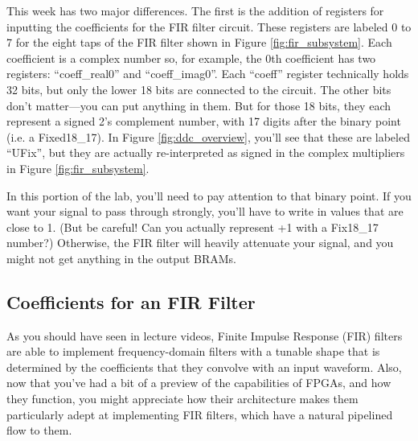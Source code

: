 \documentclass[11pt]{article}
\begin{document}
This week has two major differences.  The first is the addition of registers for inputting the
coefficients for the FIR filter circuit.  These registers are labeled 0 to 7 for the eight
taps of the FIR filter shown in Figure \ref{fig:fir_subsystem}.  Each coefficient is a complex
number so, for example, the 0th coefficient has two registers: ``coeff\_real0'' and ``coeff\_imag0''.
Each ``coeff'' register technically holds 32 bits, but only the lower 18 bits are connected to
the circuit.  The other bits don't matter---you can put anything in them.  But for those 18 bits,
they each represent a signed 2's complement number, with 17 digits after the binary point
(i.e. a Fixed18\_17).  In Figure \ref{fig:ddc_overview}, you'll see that these are labeled ``UFix'',
but they are actually re-interpreted as signed in the complex multipliers in Figure \ref{fig:fir_subsystem}.

In this portion of the lab, you'll need to pay attention to that binary point.  If you want your signal
to pass through strongly, you'll have to write in values that are close to 1. (But be careful! Can you
actually represent +1 with a Fix18\_17 number?)  Otherwise, the FIR filter will heavily attenuate
your signal, and you might not get anything in the output BRAMs.

\subsection{Coefficients for an FIR Filter} \label{fir_filter}

As you should have seen in lecture videos, Finite Impulse Response (FIR) filters are
able to implement frequency-domain filters with a tunable shape that is determined
by the coefficients that they convolve with an input waveform.
Also, now that you've had a bit of a preview of the capabilities of FPGAs, and how they function,
you might appreciate how their architecture makes them particularly adept at implementing
FIR filters, which have a natural pipelined flow to them.
\end{document}
